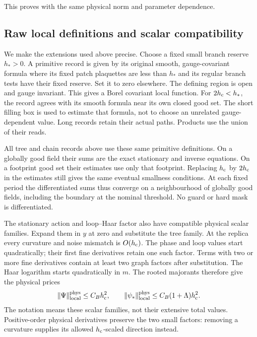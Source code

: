 \documentclass[11pt,reqno]{amsart}
\numberwithin{equation}{section}
\theoremstyle{definition}
\theoremstyle{remark}
\begin{document}
This proves \cite[Proposition~25.3,
pp.~134--137]{Main} with the same physical
norm and parameter dependence.

\subsection{Raw local definitions and scalar compatibility}

We make the extensions used above precise.
Choose a fixed small branch reserve
\(h_*>0\). A primitive record is given
by its original smooth, gauge-covariant
formula where its fixed patch plaquettes
are less than \(h_*\) and its regular
branch tests have their fixed reserve.
Set it to zero elsewhere.
The defining region is open and gauge
invariant. This gives a Borel covariant
local function.
For \(2h_{\rm c}<h_*\), the record agrees
with its smooth formula near its own
closed good set.
The short filling box is used to
estimate that formula, not to choose
an unrelated gauge-dependent value.
Long records retain their actual paths.
Products use the union of their reads.

All tree and chain records above use
these same primitive definitions.
On a globally good field their sums
are the exact stationary and inverse
equations. On a footprint good set
their estimates use only that footprint.
Replacing \(h_{\rm c}\) by \(2h_{\rm c}\)
in the estimates still gives the same
eventual smallness conditions. At each
fixed period the differentiated sums
thus converge on a neighbourhood of
globally good fields, including the
boundary at the nominal threshold.
No guard or hard mask is differentiated.

The stationary action and loop--Haar
factor also have compatible physical
scalar families. Expand them in \(y\)
at zero and substitute the tree family.
At the replica every curvature and
noise mismatch is \(O(h_{\rm c})\).
The phase and loop values start
quadratically; their first fine
derivatives retain one such factor.
Terms with two or more fine derivatives
contain at least two graph factors
after substitution.
The Haar logarithm starts quadratically
in \(m\).
The rooted majorants therefore give
the physical prices
\begin{equation}
       \|\Psi\|_{\rm local}^{\rm phys}
                         \le C_Bh_{\rm c}^2,\qquad
       \|\psi_*\|_{\rm local}^{\rm phys}
                         \le C_B(1+\Lambda)h_{\rm c}^2 .
 \label{eq:compatible-stationary-scalar-prices}
\end{equation}
The notation means these scalar
families, not their extensive total
values. Positive-order physical
derivatives preserve the two small
factors: removing a curvature supplies
its allowed \(h_{\rm c}\)-scaled
direction instead.
\end{document}
